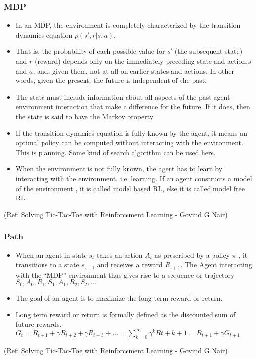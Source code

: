 \begin{frame}[fragile]\frametitle{MDP}


\begin{itemize}
\item In an MDP, the environment is completely characterized by the transition dynamics equation $p(s',r|s,a)$.
\item That is, the probability of each possible value for $s'$ (the subsequent state) and $r$ (reward) depends only on the immediately preceding state and action,$s$ and $a$, and, given them, not at all on earlier states and actions. In other words, given the present, the future is independent of the past.
\item The state must include information about all aspects of the past agent–environment interaction that make a difference for the future. If it does, then the state is said to have the Markov property
\item If the transition dynamics equation is fully known by the agent, it means an optimal policy can be computed without interacting with the environment. This is planning. Some kind of search algorithm can be used here.
\item When the environment is not fully known, the agent has to learn by interacting with the environment. i.e. learning. If an agent constructs a model of the environment , it is called model based RL, else it is called model free RL.
\end{itemize}



{\tiny (Ref: Solving Tic-Tac-Toe with Reinforcement Learning - Govind G Nair)}

\end{frame}

\begin{frame}[fragile]\frametitle{Path}


\begin{itemize}
\item When an agent in state $s_t$ takes an action $A_t$ as prescribed by a policy $\pi$ , it transitions to a state $s_{t+1}$ and receives a reward $R_{t+1}$. The Agent interacting with the ``MDP'' environment thus gives rise to a sequence or trajectory $S_0,A_0,R_1,S_1,A_1,R_2,S_2,\ldots$
\item The goal of an agent is to maximize the long term reward or return.
\item Long term reward or return is formally defined as the discounted sum of future rewards. $G_t = R_{t+1} + \gamma R_{t+2} + \gamma R_{t+3} + \ldots = \sum_{k=0}^{\infty} \gamma^k R{t+k+1} = R_{t+1} + \gamma G_{t+1}$
\end{itemize}



{\tiny (Ref: Solving Tic-Tac-Toe with Reinforcement Learning - Govind G Nair)}

\end{frame}


